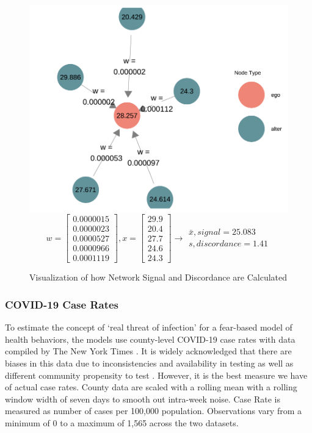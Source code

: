 \begin{figure}
\begin{center}\includegraphics[width=0.5\linewidth,]{figs/paper3/discordancenetwork-1} 
  \begin{equation}
    w = \begin{bmatrix}0.0000015\\0.0000023\\0.0000527\\0.0000966\\0.0001119\end{bmatrix},  
    x = \begin{bmatrix}29.9\\20.4\\27.7\\24.6\\24.3\end{bmatrix} \longrightarrow
    \begin{matrix} \bar{x}, signal = 25.083\\ s, discordance = 1.41 \end{matrix} 
  \end{equation}
  \caption{Visualization of how Network Signal and Discordance are Calculated}
  \label{fig:discordancenetwork}
  \end{center}
\end{figure}

\hypertarget{COVID-19-case-rates}{%
\subsubsection{COVID-19 Case Rates}\label{COVID-19-case-rates}}

To estimate the concept of `real threat of infection' for a fear-based model of
health behaviors, the models use county-level COVID-19 case rates with
data compiled by The New York Times \citeyearpar{covid_data}. It is widely acknowledged that there are biases in this data due to inconsistencies and availability in testing as well as
different community propensity to test \citep{gu22, cdc20a}. However, it is the best
measure we have of actual case rates. County data are scaled with a rolling mean
with a rolling window width of seven days to smooth out intra-week noise. Case
Rate is measured as number of cases per 100,000 population. Observations vary
from a minimum of 0 to a maximum of 1,565 across the two datasets.

